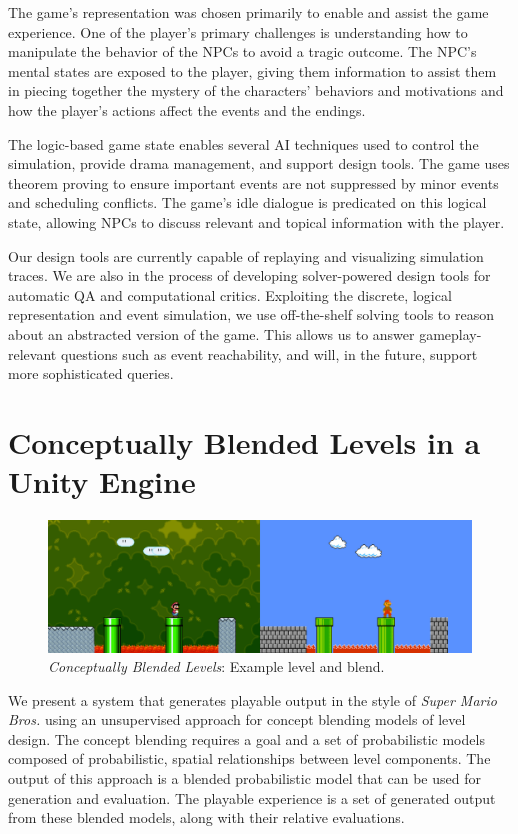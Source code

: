 \documentclass[letterpaper]{article}
\begin{document}
The game's representation was chosen primarily to enable and assist the game experience.
One of the player's primary challenges is understanding how to manipulate the behavior of the NPCs to avoid a tragic outcome.
The NPC's mental states are exposed to the player, giving them information to assist them in piecing together the mystery of the characters' behaviors and motivations and how the player's actions affect the events and the endings.

The logic-based game state enables several AI techniques used to control the simulation, provide drama management, and support design tools.
The game uses theorem proving to ensure important events are not suppressed by minor events and scheduling conflicts.
The game's idle dialogue is predicated on this logical state, allowing NPCs to discuss relevant and topical information with the player.

Our design tools are currently capable of replaying and visualizing simulation traces.
We are also in the process of developing solver-powered design tools for automatic QA and computational critics.
Exploiting the discrete, logical representation and event simulation, we use off-the-shelf solving tools to reason about an abstracted version of the game.
This allows us to answer gameplay-relevant questions such as event reachability, and will, in the future, support more sophisticated queries.



\section{Conceptually Blended Levels in a Unity Engine}

\begin{figure}[tbh]
  \centering
  \includegraphics[width=\columnwidth]{images/conceptual_blend-screen}
  \caption{\textit{Conceptually Blended Levels}: Example level and blend.}
  \label{fig:cb-placeholder}
\end{figure}

We present a system that generates playable output in the style of \textit{Super Mario Bros.} using an unsupervised approach for concept blending models of level design.
The concept blending requires a goal and a set of probabilistic models composed of probabilistic, spatial relationships between level components.
The output of this approach is a blended probabilistic model that can be used for generation and evaluation.
The playable experience is a set of generated output from these blended models, along with their relative evaluations.
\end{document}
